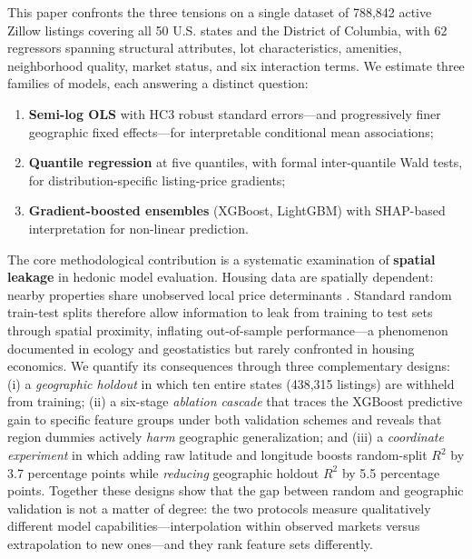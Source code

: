 This paper confronts the three tensions on a single dataset of 788,842 active
Zillow listings covering all 50 U.S. states and the District of Columbia, with 62
regressors spanning structural attributes, lot characteristics, amenities,
neighborhood quality, market status, and six interaction terms. We estimate three
families of models, each answering a distinct question:
\begin{enumerate}[nosep]
    \item \textbf{Semi-log OLS} with HC3 robust standard errors---and progressively
    finer geographic fixed effects---for interpretable conditional mean
    associations;
    \item \textbf{Quantile regression} at five quantiles, with formal
    inter-quantile Wald tests, for distribution-specific listing-price gradients;
    \item \textbf{Gradient-boosted ensembles} (XGBoost, LightGBM) with SHAP-based
    interpretation \citep{lundberg2017unified} for non-linear prediction.
\end{enumerate}

The core methodological contribution is a systematic examination of
\textbf{spatial leakage} in hedonic model evaluation. Housing data are spatially
dependent: nearby properties share unobserved local price determinants
\citep{dubin1998spatial, basu1998analysis}. Standard random train-test splits
therefore allow information to leak from training to test sets through spatial
proximity, inflating out-of-sample performance---a phenomenon documented in
ecology and geostatistics \citep{roberts2017cross, ploton2020spatial,
meyer2021predicting} but rarely confronted in housing economics. We quantify its
consequences through three complementary designs: (i) a \emph{geographic holdout}
in which ten entire states (438,315 listings) are withheld from training; (ii) a
six-stage \emph{ablation cascade} that traces the XGBoost predictive gain to
specific feature groups under both validation schemes and reveals that region
dummies actively \emph{harm} geographic generalization; and (iii) a
\emph{coordinate experiment} in which adding raw latitude and longitude boosts
random-split $R^2$ by 3.7 percentage points while \emph{reducing} geographic
holdout $R^2$ by 5.5 percentage points. Together these designs show that the gap
between random and geographic validation is not a matter of degree: the two
protocols measure qualitatively different model capabilities---interpolation
within observed markets versus extrapolation to new ones---and they rank feature
sets differently.


